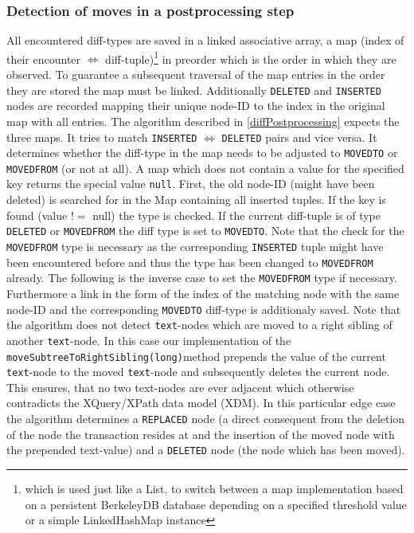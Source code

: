 \subsubsection{Detection of moves in a postprocessing step} All encountered diff-types are saved in a linked associative array, a map (index of their encounter $\Leftrightarrow$ diff-tuple)\footnote{which is used just like a List, to switch between a map implementation based on a persistent BerkeleyDB database depending on a specified threshold value or a simple LinkedHashMap instance} in preorder which is the order in which they are observed. To guarantee a subsequent traversal of the map entries in the order they are stored the map must be linked. Additionally \texttt{DELETED} and \texttt{INSERTED} nodes are recorded mapping their unique node-ID to the index in the original map with all entries. The algorithm described in \ref{diffPostprocessing} expects the three maps. It tries to match \texttt{INSERTED} $\Leftrightarrow$ \texttt{DELETED} pairs and vice versa. It determines whether the diff-type in the map needs to be adjusted to \texttt{MOVEDTO} or \texttt{MOVEDFROM} (or not at all). A map which does not contain a value for the specified key returns the special value \texttt{null}. First, the old node-ID (might have been deleted) is searched for in the Map containing all inserted tuples. If the key is found (value $!=$ null) the type is checked. If the current diff-tuple is of type \texttt{DELETED} or \texttt{MOVEDFROM} the diff type is set to \texttt{MOVEDTO}. Note that the check for the \texttt{MOVEDFROM} type is necessary as the corresponding \texttt{INSERTED} tuple might have been encountered before and thus the type has been changed to \texttt{MOVEDFROM} already. The following is the inverse case to set the \texttt{MOVEDFROM} type if necessary. Furthermore a link in the form of the index of the matching node with the same node-ID and the corresponding \texttt{MOVEDTO} diff-type is additionaly saved. Note that the algorithm does not detect \texttt{text}-nodes which are moved to a right sibling of another \texttt{text}-node. In this case our implementation of the \texttt{moveSubtreeToRightSibling(long)}\-method prepends the value of the current \texttt{text}-node to the moved \texttt{text}-node and subsequently deletes the current node. This ensures, that no two text-nodes are ever adjacent which otherwise contradicts the XQuery/XPath data model (XDM). In this particular edge case the algorithm determines a \texttt{REPLACED} node (a direct consequent from the deletion of the node the transaction resides at and the insertion of the moved node with the prepended text-value) and a \texttt{DELETED} node (the node which has been moved).

